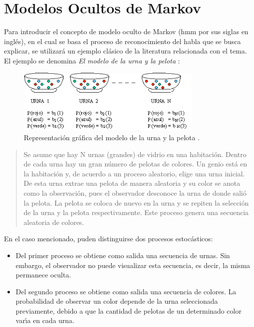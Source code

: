 \section{Modelos Ocultos de Markov}
\label{sec:hmm}

Para introducir el concepto de modelo oculto de Markov (\gls{hmm} por sus siglas en ingl\'es), 
en el cual se basa el proceso de reconocimiento del habla que se busca explicar, 
se utilizar\'a un ejemplo cl\'asico de la literatura relacionada con el tema.
El ejemplo se denomina \emph{El modelo de la urna y la pelota} \cite{Rabiner89atutorial}:

\begin{figure}[H] 
\centering
\includegraphics[width=0.8\textwidth]{./graphics/urnas.png}
\caption{Representaci\'on gr\'afica del modelo de la urna y la pelota \cite{LleidaModelado}.}
\label{figure:urnas}
\end{figure}

\begin{quote}
	Se asume que hay N urnas (grandes) de vidrio en una habitaci\'on. Dentro de cada urna hay un gran 
	n\'umero de pelotas de colores.
	Un genio est\'a en la habitaci\'on y, de acuerdo a un proceso aleatorio, elige una urna inicial. 
	De esta urna extrae una pelota de manera aleatoria y su color se anota como la observaci\'on, 
	pues el observador desconoce la urna de donde sali\'o la pelota.
	La pelota se coloca de nuevo en la urna y se repiten la selecci\'on de la urna y la pelota respectivamente.
	Este proceso genera una secuencia aleatoria de colores.
\end{quote}

En el caso mencionado, puden distinguirse dos procesos estoc\'asticos:
\begin{itemize}
	\item Del primer proceso se obtiene como salida una secuencia de urnas. Sin embargo, el observador
	no puede visualizar esta secuencia, es decir, la misma permanece oculta.
	\item Del segundo proceso se obtiene como salida una secuencia de colores. La probabilidad de observar
	un color depende de la urna seleccionada previamente, debido a que la cantidad de pelotas de un determinado
	color var{\'\i}a en cada urna.
\end{itemize}

